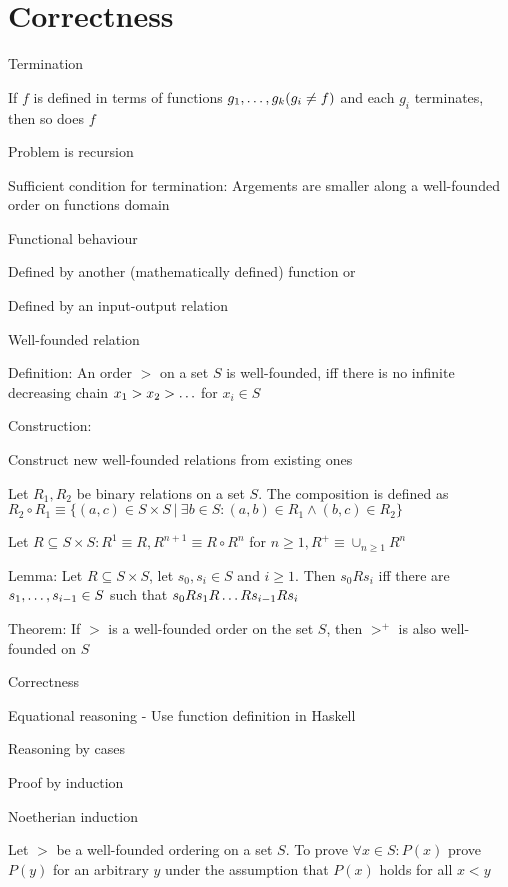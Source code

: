\section{Correctness}
\enumstart
	\item Termination
	\enumstart
		\item If $f$ is defined in terms of functions $g_1, \mathellipsis, g_k (g_i \ne f)$ and each $g_i$ terminates, then so does $f$
		\item Problem is recursion
		\item Sufficient condition for termination: Argements are smaller along a well-founded order on functions domain
	\enumend
	\item Functional behaviour
	\enumstart
		\item Defined by another (mathematically defined) function or
		\item Defined by an input-output relation
	\enumend
	\item Well-founded relation
	\enumstart
		\item Definition: An order $>$ on a set $S$ is well-founded, iff there is no infinite decreasing chain $x_1 > x_2 > \mathellipsis$ for $x_i \in S$
		\item Construction:
		\enumstart
			\item Construct new well-founded relations from existing ones
			\enumstart
				\item Let $R_1, R_2$ be binary relations on a set $S$. The composition is defined as $R_2 \circ R_1 \equiv \{(a,c) \in S \times S \ | \ \exists b \in S: (a,b) \in R_1 \land (b,c) \in R_2\}$
				\item Let $R \subseteq S \times S: R^1 \equiv R, R^{n+1} \equiv R \circ R^n$ for $n \ge 1, R^+ \equiv \cup_{n \ge 1}R^n$
				\item Lemma: Let $R \subseteq S \times S$, let $s_0, s_i \in S$ and $i \ge 1$. Then $s_0Rs_i$ iff there are $s_1, \mathellipsis, s_{i-1} \in S$ such that $s_0Rs_1R\mathellipsis Rs_{i-1}Rs_i$
				\item Theorem:  If $>$ is a well-founded order on the set $S$, then $>^+$ is also well-founded on $S$
			\enumend
		\enumend
	\enumend
	\item Correctness
	\enumstart
		\item Equational reasoning - Use function definition in Haskell
		\item Reasoning by cases
		\item Proof by induction
		\item Noetherian induction
		\enumstart
			\item Let $>$ be a well-founded ordering on a set $S$. To prove $\forall x \in S: P(x)$ prove $P(y)$ for an arbitrary $y$ under the assumption that $P(x)$ holds for all $x < y$
		\enumend
	\enumend
\enumend
